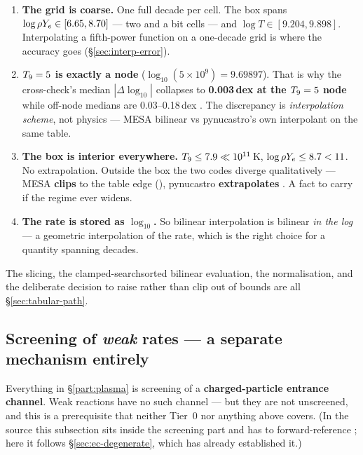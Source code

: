 \begin{enumerate}
\item \textbf{The grid is coarse.} One full decade per \rhoye{} cell. The box
      spans $\log\rho Y_{e} \in [6.65, 8.70]$ --- two and a bit cells --- and
      $\log T \in [9.204, 9.898]$. Interpolating a fifth-power function on a
      one-decade grid is where the accuracy goes
      (\S\ref{sec:interp-error}).
\item \textbf{$T_{9} = 5$ is exactly a node} ($\log_{10}(5\times10^9) = 9.69897$).
      That is why the cross-check's median $|\Delta\log_{10}|$ collapses to
      \textbf{0.003\,dex at the $T_{9} = 5$ node} while off-node medians are
      0.03--0.18\,dex . The discrepancy is
      \emph{interpolation scheme}, not physics --- MESA bilinear vs pynucastro's
      own interpolant on the same table.
\item \textbf{The box is interior everywhere.} $T_{9} \le 7.9 \ll 10^{11}$\,K,
      $\log\rho Y_{e} \le 8.7 < 11$. No extrapolation. Outside the box the two codes
      diverge qualitatively --- MESA \textbf{clips} to the table edge
      (), pynucastro \textbf{extrapolates}
      . A fact to carry if the regime ever widens.
\item \textbf{The rate is stored as $\log_{10}$.} So bilinear interpolation is
      bilinear \emph{in the log} --- a geometric interpolation of the rate,
      which is the right choice for a quantity spanning decades.
\end{enumerate}

The slicing, the clamped-searchsorted bilinear evaluation, the \Ye{}
normalisation, and the deliberate decision to raise rather than clip out of
bounds are all \S\ref{sec:tabular-path}.

\subsection{Screening of \emph{weak} rates --- a separate mechanism entirely}
\label{sec:weak-screening}

Everything in \S\ref{part:plasma} is screening of a \textbf{charged-particle
entrance channel}. Weak reactions have no such channel --- but they are not
unscreened, and this is a prerequisite that neither Tier~0 nor anything above
covers. (In the source this subsection sits inside the screening part and has to
forward-reference \muE; here it follows \S\ref{sec:ec-degenerate}, which has
already established it.)

